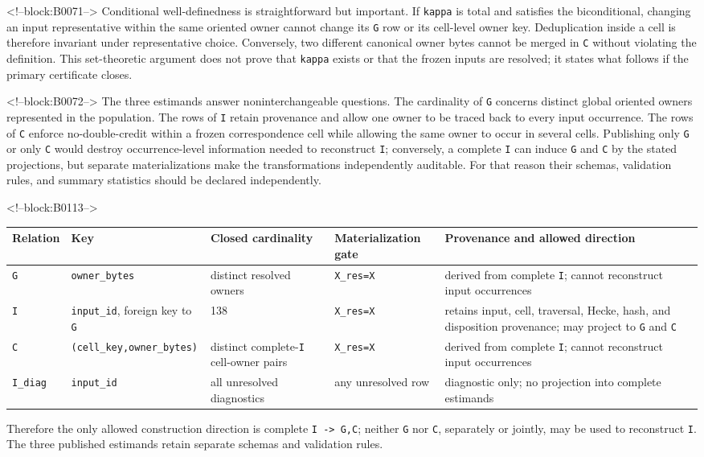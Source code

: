 \documentclass[11pt]{article}
\begin{document}
<!--block:B0071-->
Conditional well-definedness is straightforward but important. If
\texttt{kappa} is total and satisfies the biconditional, changing an
input representative within the same oriented owner cannot change its
\texttt{G} row or its cell-level owner key. Deduplication inside a cell
is therefore invariant under representative choice. Conversely, two
different canonical owner bytes cannot be merged in \texttt{C} without
violating the definition. This set-theoretic argument does not prove
that \texttt{kappa} exists or that the frozen inputs are resolved; it
states what follows if the primary certificate closes.

<!--block:B0072-->
The three estimands answer noninterchangeable questions. The cardinality
of \texttt{G} concerns distinct global oriented owners represented in
the population. The rows of \texttt{I} retain provenance and allow one
owner to be traced back to every input occurrence. The rows of
\texttt{C} enforce no-double-credit within a frozen correspondence cell
while allowing the same owner to occur in several cells. Publishing only
\texttt{G} or only \texttt{C} would destroy occurrence-level information
needed to reconstruct \texttt{I}; conversely, a complete \texttt{I} can
induce \texttt{G} and \texttt{C} by the stated projections, but separate
materializations make the transformations independently auditable. For
that reason their schemas, validation rules, and summary statistics
should be declared independently.

<!--block:B0113-->
\begin{center}
\scriptsize
\begin{tabular}{@{}p{.10\linewidth}p{.20\linewidth}p{.10\linewidth}p{.18\linewidth}p{.30\linewidth}@{}}
\toprule
Relation & Key & Closed cardinality & Materialization gate & Provenance and allowed direction \\
\midrule
\texttt{G} & \texttt{owner\_bytes} & distinct resolved owners & \texttt{X\_res=X} & derived from complete \texttt{I}; cannot reconstruct input occurrences \\
\texttt{I} & \texttt{input\_id}, foreign key to \texttt{G} & 138 & \texttt{X\_res=X} & retains input, cell, traversal, Hecke, hash, and disposition provenance; may project to \texttt{G} and \texttt{C} \\
\texttt{C} & \texttt{(cell\_key,owner\_bytes)} & distinct complete-\texttt{I} cell-owner pairs & \texttt{X\_res=X} & derived from complete \texttt{I}; cannot reconstruct input occurrences \\
\texttt{I\_diag} & \texttt{input\_id} & all unresolved diagnostics & any unresolved row & diagnostic only; no projection into complete estimands \\
\bottomrule
\end{tabular}
\end{center}
Therefore the only allowed construction direction is complete
\texttt{I -> G,C}; neither \texttt{G} nor \texttt{C}, separately or jointly,
may be used to reconstruct \texttt{I}.  The three published estimands retain
separate schemas and validation rules.
\end{document}
